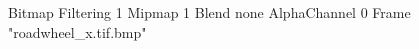 {Bitmap
	{Filtering 1}
	{Mipmap 1}
	{Blend none}
	{AlphaChannel 0}
	{Frame "roadwheel_x.tif.bmp"}
}
